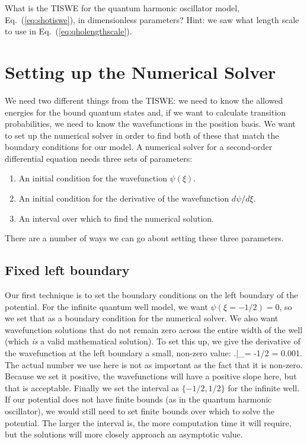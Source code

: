 \begin{exercise}
What is the TISWE for the quantum harmonic oscillator model, Eq.~(\ref{eq:shotiswe}), in dimensionless parameters? Hint: we saw what length scale to use in Eq.~(\ref{eq:qholengthscale}).
\end{exercise}

\section{Setting up the Numerical Solver}
We need two different things from the TISWE: we need to know the allowed energies for the bound quantum states and, if we want to calculate transition probabilities, we need to know the wavefunctions in the position basis. We want to set up the numerical solver in order to find both of these that match the boundary conditions for our model. A numerical solver for a second-order differential equation needs three sets of parameters:
\begin{enumerate}
\item An initial condition for the wavefunction $\psi(\xi)$.
\item An initial condition for the derivative of the wavefunction $d\psi/d\xi$.
\item An interval over which to find the numerical solution.
\end{enumerate}
There are a number of ways we can go about setting these three parameters.

\subsection{Fixed left boundary}
Our first technique is to set the boundary conditions on the left boundary of the potential. For the infinite quantum well model, we want $\psi(\xi=-1/2) = 0$, so we set that as a boundary condition for the numerical solver. We also want wavefunction solutions that do not remain zero across the entire width of the well (which {\em is} a valid mathematical solution). To set this up, we give the derivative of the wavefunction at the left boundary a small, non-zero value: 
\beq
\left.\right|_{\xi = -1/2} = 0.001.
\eeq
The actual number we use here is not as important as the fact that it is non-zero. Because we set it positive, the wavefunctions will have a positive slope here, but that is acceptable. Finally we set the interval as $\{-1/2,1/2\}$ for the infinite well. If our potential does not have finite bounds (as in the quantum harmonic oscillator), we would still need to set finite bounds over which to solve the potential. The larger the interval is, the more computation time it will require, but the solutions will more closely approach an asymptotic value.

